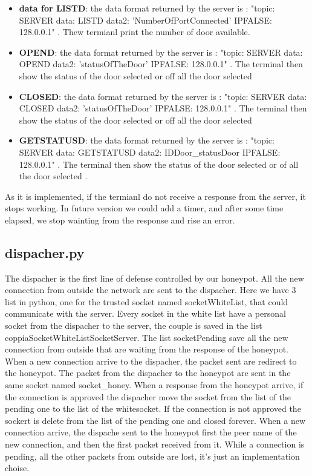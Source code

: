 \begin{itemize}
\item \textbf{data for LISTD}: the data format returned by the server is : "topic: SERVER data: LISTD data2: 'NumberOfPortConnected' IPFALSE: 128.0.0.1" . Thew termianl print the number of door available.
\item \textbf{OPEND}: the data format returned by the server is : "topic: SERVER data: OPEND data2: 'statusOfTheDoor' IPFALSE: 128.0.0.1" . The terminal then show the status of the door selected or off all the door selected
\item \textbf{CLOSED}: the data format returned by the server is : "topic: SERVER data: CLOSED data2: 'statusOfTheDoor' IPFALSE: 128.0.0.1" . The terminal then show the status of the door selected or off all the door selected
\item \textbf{GETSTATUSD}:  the data format returned by the server is : "topic: SERVER data: GETSTATUSD data2: IDDoor\_statusDoor IPFALSE: 128.0.0.1" . The terminal then show the status of the door selected or of all the door selected .
\end{itemize}
As it is implemented, if the termianl do not receive a response from the server, it stops working.  In future version we could add a timer, and after some time elapsed, we stop wainting from the response and rise an error.


\subsection{dispacher.py}
The dispacher is the first line of defense controlled by our honeypot. All the new connection from outside the network are sent to the dispacher. Here we have 3 list in python, one for the trusted socket named socketWhiteList, that could communicate with the server. Every socket in the white list have a personal socket from the dispacher to the server, the couple is saved in the list coppiaSocketWhiteListSocketServer. The list socketPending save all the new connection from outside that are waiting from the response of the honeypot. When a new connection arrive to the dispacher, the packet sent are redirect to the honeypot. The packet from the dispacher to the honeypot are sent in the same socket named socket\_honey. When a response from the honeypot arrive, if the connection is approved the dispacher move the socket from the list of the pending one to the list of the whitesocket. If the connection is not approved the sockert is delete from the list of the pending one and closed forever.  When a new connection arrive, the dispache sent to the honeypot first the peer name of the new connection, and then the first packet received from it. While a connection is pending, all the other packets from outside are lost, it's just an implementation choise.

